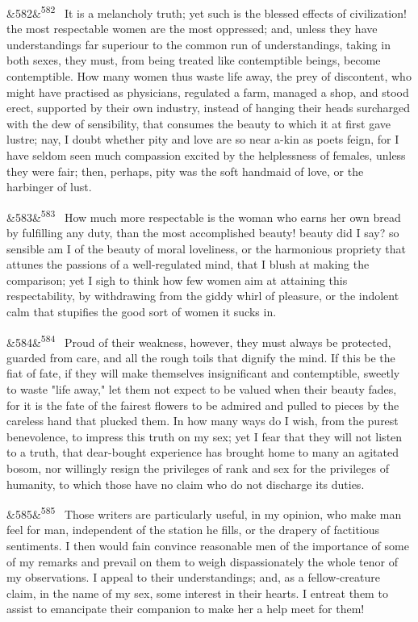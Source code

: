 \documentclass[12pt]{article}
\newcommand{\para}[1][]{\par\noindent\ifx&#1&\else\textsuperscript{\footnotesize #1}~\fi}
\begin{document}
\para[582] It is a melancholy truth; yet such is the blessed effects of civilization! the most respectable women are the most oppressed; and, unless they have understandings far superiour to the common run of understandings, taking in both sexes, they must, from being treated like contemptible beings, become contemptible. How many women thus waste life away, the prey of discontent, who might have practised as physicians, regulated a farm, managed a shop, and stood erect, supported by their own industry, instead of hanging their heads surcharged with the dew of sensibility, that consumes the beauty to which it at first gave lustre; nay, I doubt whether pity and love are so near a-kin as poets feign, for I have seldom seen much compassion excited by the helplessness of females, unless they were fair; then, perhaps, pity was the soft handmaid of love, or the harbinger of lust.

\para[583] How much more respectable is the woman who earns her own bread by fulfilling any duty, than the most accomplished beauty! beauty did I say? so sensible am I of the beauty of moral loveliness, or the harmonious propriety that attunes the passions of a well-regulated mind, that I blush at making the comparison; yet I sigh to think how few women aim at attaining this respectability, by withdrawing from the giddy whirl of pleasure, or the indolent calm that stupifies the good sort of women it sucks in.

\para[584] Proud of their weakness, however, they must always be protected, guarded from care, and all the rough toils that dignify the mind. If this be the fiat of fate, if they will make themselves insignificant and contemptible, sweetly to waste "life away," let them not expect to be valued when their beauty fades, for it is the fate of the fairest flowers to be admired and pulled to pieces by the careless hand that plucked them. In how many ways do I wish, from the purest benevolence, to impress this truth on my sex; yet I fear that they will not listen to a truth, that dear-bought experience has brought home to many an agitated bosom, nor willingly resign the privileges of rank and sex for the privileges of humanity, to which those have no claim who do not discharge its duties.

\para[585] Those writers are particularly useful, in my opinion, who make man feel for man, independent of the station he fills, or the drapery of factitious sentiments. I then would fain convince reasonable men of the importance of some of my remarks and prevail on them to weigh dispassionately the whole tenor of my observations. I appeal to their understandings; and, as a fellow-creature claim, in the name of my sex, some interest in their hearts. I entreat them to assist to emancipate their companion to make her a help meet for them!
\end{document}

